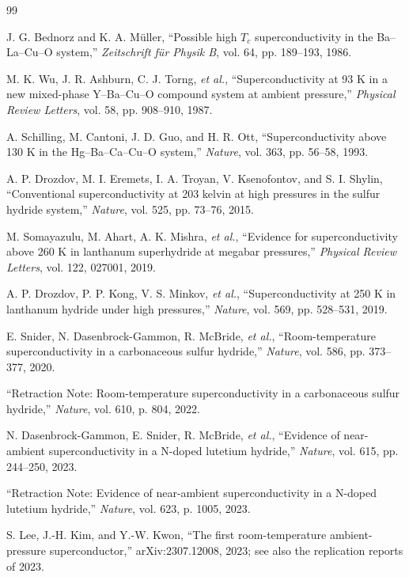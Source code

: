 \documentclass[10pt,letterpaper]{article}
\begin{document}
\begingroup
\raggedright
\begin{thebibliography}{99}

 J. G. Bednorz and K. A. Müller, ``Possible high $T_c$ superconductivity in the Ba--La--Cu--O system,'' \emph{Zeitschrift für Physik B}, vol. 64, pp. 189--193, 1986.

 M. K. Wu, J. R. Ashburn, C. J. Torng, \emph{et al.}, ``Superconductivity at 93 K in a new mixed-phase Y--Ba--Cu--O compound system at ambient pressure,'' \emph{Physical Review Letters}, vol. 58, pp. 908--910, 1987.

 A. Schilling, M. Cantoni, J. D. Guo, and H. R. Ott, ``Superconductivity above 130 K in the Hg--Ba--Ca--Cu--O system,'' \emph{Nature}, vol. 363, pp. 56--58, 1993.

 A. P. Drozdov, M. I. Eremets, I. A. Troyan, V. Ksenofontov, and S. I. Shylin, ``Conventional superconductivity at 203 kelvin at high pressures in the sulfur hydride system,'' \emph{Nature}, vol. 525, pp. 73--76, 2015.

 M. Somayazulu, M. Ahart, A. K. Mishra, \emph{et al.}, ``Evidence for superconductivity above 260 K in lanthanum superhydride at megabar pressures,'' \emph{Physical Review Letters}, vol. 122, 027001, 2019.

 A. P. Drozdov, P. P. Kong, V. S. Minkov, \emph{et al.}, ``Superconductivity at 250 K in lanthanum hydride under high pressures,'' \emph{Nature}, vol. 569, pp. 528--531, 2019.

 E. Snider, N. Dasenbrock-Gammon, R. McBride, \emph{et al.}, ``Room-temperature superconductivity in a carbonaceous sulfur hydride,'' \emph{Nature}, vol. 586, pp. 373--377, 2020.

 ``Retraction Note: Room-temperature superconductivity in a carbonaceous sulfur hydride,'' \emph{Nature}, vol. 610, p. 804, 2022.

 N. Dasenbrock-Gammon, E. Snider, R. McBride, \emph{et al.}, ``Evidence of near-ambient superconductivity in a N-doped lutetium hydride,'' \emph{Nature}, vol. 615, pp. 244--250, 2023.

 ``Retraction Note: Evidence of near-ambient superconductivity in a N-doped lutetium hydride,'' \emph{Nature}, vol. 623, p. 1005, 2023.

 S. Lee, J.-H. Kim, and Y.-W. Kwon, ``The first room-temperature ambient-pressure superconductor,'' arXiv:2307.12008, 2023; see also the replication reports of 2023.


\end{thebibliography}
\end{document}
